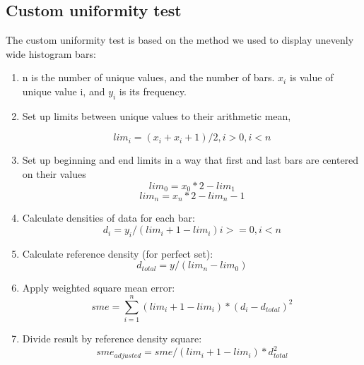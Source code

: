 \documentclass[10pt, a4paper]{article}
\begin{document}
\subsection{Custom uniformity test}
The custom uniformity test is based on the method we used to display unevenly wide histogram bars:

\begin{enumerate}
\item n is the number of unique values, and the number of bars. $x_i$ is value of unique value i, and $y_i$ is its frequency.

\item Set up limits between unique values to their arithmetic mean,

\begin{equation}\label{eq:bars}
lim_i = (x_i + x_i+1)/2, i>0,i<n
\end{equation}

\item Set up beginning and end limits in a way that first and last bars are centered on their values
\begin{equation}\label{eq:lim_0}
lim_0 = x_0*2 - lim_1
\end{equation}
\begin{equation}\label{eq:lim_n}
lim_n = x_n*2 - lim_n-1
\end{equation}

\item Calculate densities of data for each bar:
\begin{equation}\label{eq:lim_n}
d_i = y_i/(lim_i+1 - lim_i) i>=0,i<n
\end{equation}

\item Calculate reference density (for perfect set):
\begin{equation}\label{eq:lim_n}
d_{total} = y/(lim_n - lim_0)
\end{equation}

\item Apply weighted square mean error:
\begin{equation}\label{eq:lim_n}
sme = \sum_{i=1}^n (lim_i+1 - lim_i)*(d_i-d_{total})^2
\end{equation}


\item Divide result by reference density square:
\begin{equation}\label{eq:lim_n}
sme_{adjusted} = sme/(lim_i+1 - lim_i)*d_{total}^2
\end{equation}
\end{enumerate}
\end{document}
